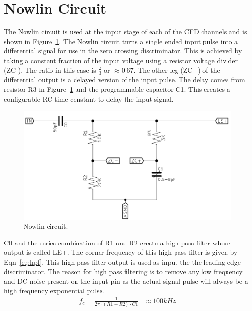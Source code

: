 \documentclass[12pt,oneside,final]{siuethesis}
\theoremstyle{definition}
\begin{document}
\section{Nowlin Circuit}
\par The Nowlin circuit is used at the input stage of each of the CFD channels and is shown in Figure~\ref{fig:Nowlin}. The Nowlin circuit turns a single ended input pulse into a differential signal for use in the zero crossing discriminator. This is achieved by taking a constant fraction of the input voltage using a resistor voltage divider (ZC-). The ratio in this case is $\frac{2}{3}$ or $\approx 0.67$. The other leg (ZC+) of the differential output is a delayed version of the input pulse. The delay comes from resistor R3 in Figure~\ref{fig:Nowlin} and the programmable capacitor C1. This creates a configurable RC time constant to delay the input signal. 
\begin{figure}[ht]
\centering
\includegraphics[scale=.6,keepaspectratio=true]{images/nowlin_circuit.png} 
\caption{Nowlin circuit.}
\label{fig:Nowlin}
\end{figure}
\par C0 and the series combination of R1 and R2 create a high pass filter whose output is called LE+. The corner frequency of this high pass filter is given by Eqn~\ref{eq:hpf}. This high pass filter output is used as input the the leading edge discriminator. The reason for high pass filtering is to remove any low frequency and DC noise present on the input pin as the actual signal pulse will always be a high frequency exponential pulse.
\begin{align}
f_{c} = \frac{1}{2\pi \cdot(R1+R2)\cdot C1} &\approx 100 kHz
\label{eq:hpf}
\end{align}
\end{document}
